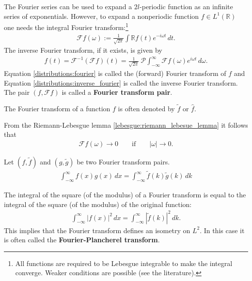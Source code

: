    The Fourier series can be used to expand a $2l$-periodic function as an infinite series of exponentials. However, to expand a nonperiodic function $f\in L^1(\mathbb{R})$ one needs the integral Fourier transform:\footnote{All functions are required to be Lebesgue integrable to make the integral converge. Weaker conditions are possible (see the literature).}
    \begin{gather}
        \label{distributions:fourier}
        \mathcal{F}f(\omega) := \frac{1}{\sqrt{2\pi}}\int\mathbb{R}f(t)e^{-i\omega t}\,dt.
    \end{gather}
    The inverse Fourier transform, if it exists, is given by
    \begin{gather}
        \label{distributions:inverse_fourier}
        f(t) = \mathcal{F}^{-1}(\mathcal{F}f)(t) = \frac{1}{\sqrt{2\pi}}\  \mathcal{P}\int_{-\infty}^\infty\mathcal{F}f(\omega)e^{i\omega t}\,d\omega.
    \end{gather}
    Equation \eqref{distributions:fourier} is called the (forward) Fourier transform of $f$ and Equation \eqref{distributions:inverse_fourier} is called the inverse Fourier transform. The pair $(f,\mathcal{F}f)$ is called a \textbf{Fourier transform pair}.
    \begin{notation}
        The Fourier transform of a function $f$ is often denoted by $\widetilde{f}$ or $\widehat{f}$.
    \end{notation}

    \begin{property}
        From the Riemann-Lebesgue lemma \ref{lebesgue:riemann_lebesue_lemma} it follows that
        \begin{gather}
            \mathcal{F}f(\omega)\longrightarrow0\qquad\text{if}\qquad |\omega|\longrightarrow0.
        \end{gather}
    \end{property}

    \begin{theorem}[Parceval]\label{distributions:parcevals_theorem}
        Let $(f,\widetilde{f})$ and $(g,\widetilde{g})$ be two Fourier transform pairs.
        \begin{gather}
            \int_{-\infty}^\infty f(x)g(x)\,dx = \int_{-\infty}^\infty\widetilde{f}(k)\widetilde{g}(k)\,dk
        \end{gather}
    \end{theorem}
    \begin{result}[Plancherel]\label{distributions:plancherel_theorem}
        The integral of the square (of the modulus) of a Fourier transform is equal to the integral of the square (of the modulus) of the original function:
        \begin{gather}
            \int_{-\infty}^\infty|f(x)|^2\,dx = \int_{-\infty}^\infty|\widetilde{f}(k)|^2\,dk.
        \end{gather}
        This implies that the Fourier transform defines an isometry on $L^2$. In this case it is often called the \textbf{Fourier-Plancherel transform}.
    \end{result}

